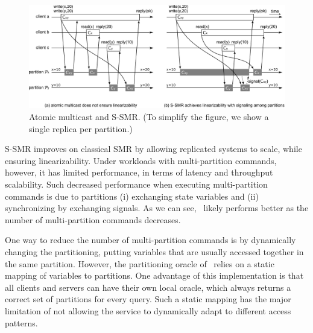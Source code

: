 \begin{figure}
\begin{minipage}[b]{1.0\linewidth} %
\centering
      \includegraphics[width=0.85\linewidth]{figures/whysignals}
\end{minipage}
\caption{Atomic multicast and S-SMR. (To simplify the figure, we show a single replica per partition.)}
\label{fig:whysignals}
\end{figure}

S-SMR improves on classical SMR by allowing replicated systems to scale, while ensuring linearizability. 
Under workloads with multi-partition commands, however, it has limited performance, in terms of latency and throughput scalability. 
Such decreased performance when executing multi-partition commands is due to
partitions (i) exchanging state variables
and (ii) synchronizing by exchanging signals.
As we can see, \ssmr\ likely performs better as the number of multi-partition commands decreases.

One way to reduce the number of multi-partition commands is by dynamically changing the partitioning, putting variables that are usually accessed together in the same partition.
However, the partitioning oracle of \ssmr\ relies on a static mapping of variables to partitions.
One advantage of this implementation is that all clients and servers can have their own local oracle, which always returns a correct set of partitions for every query.
Such a static mapping has the major limitation of not allowing the service to dynamically adapt to different access patterns.

